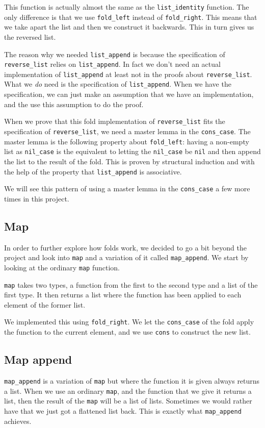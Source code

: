 \documentclass[a4paper]{article}
\begin{document}
This function is actually almost the same as the \texttt{list\_identity}
function. The only difference is that we use \texttt{fold\_left} instead of
\texttt{fold\_right}. This means that we take apart the list and then we
construct it backwards. This in turn gives us the reversed list.

The reason why we needed \texttt{list\_append} is because the specification of
\linebreak \texttt{reverse\_list} relies on \texttt{list\_append}. In fact we
don't need an actual implementation of \texttt{list\_append} at least not in
the proofs about \texttt{reverse\_list}. What we \emph{do} need is the
specification of \texttt{list\_append}. When we have the specification, we can
just make an assumption that we have an implementation, and the use this
assumption to do the proof.

When we prove that this fold implementation of \texttt{reverse\_list} fits the
specification of \texttt{reverse\_list}, we need a master lemma in the
\texttt{cons\_case}. The master lemma is the following property about
\texttt{fold\_left}: having a non-empty list as \texttt{nil\_case} is the
equivalent to letting the \texttt{nil\_case} be \texttt{nil} and then append
the list to the result of the fold. This is proven by structural induction and
with the help of the property that \texttt{list\_append} is associative.

We will see this pattern of using a master lemma in the \texttt{cons\_case} a
few more times in this project.

\subsection{Map}
In order to further explore how folds work, we decided to go a bit beyond the
project and look into \texttt{map} and a variation of it called
\texttt{map\_append}. We start by looking at the ordinary \texttt{map}
function.

\texttt{map} takes two types, a function from the first to the second type and
a list of the first type.  It then returns a list where the function has been
applied to each element of the former list.

We implemented this using \texttt{fold\_right}. We let the \texttt{cons\_case}
of the fold apply the function to the current element, and we use \texttt{cons}
to construct the new list.

\subsection{Map append}
\texttt{map\_append} is a variation of \texttt{map} but where the function it
is given always returns a list. When we use an ordinary \texttt{map}, and the
function that we give it returns a list, then the result of the \texttt{map}
will be a list of lists.  Sometimes we would rather have that we just got a
flattened list back. This is exactly what \texttt{map\_append} achieves.
\end{document}

